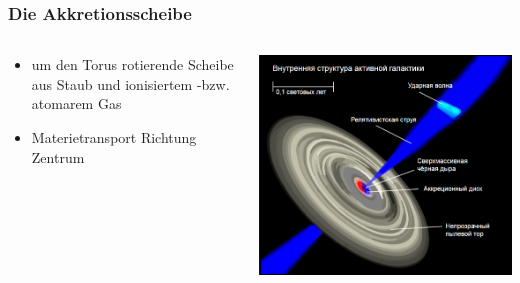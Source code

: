 \documentclass[aspectratio=1610, 9pt]{beamer}
\begin{document}
\begin{frame}\frametitle{Die Akkretionsscheibe}
  \begin{columns}
  \begin{column}[c]{0.45\linewidth}
    \begin{itemize}
      \item um den Torus rotierende Scheibe aus Staub und ionisiertem -bzw. atomarem Gas
      \item Materietransport Richtung Zentrum
    \end{itemize}
  \end{column}
  \begin{column}{0.45\linewidth}
    \includegraphics{images/accretion.png}
  \end{column}
  \end{columns}
\end{frame}
\end{document}
